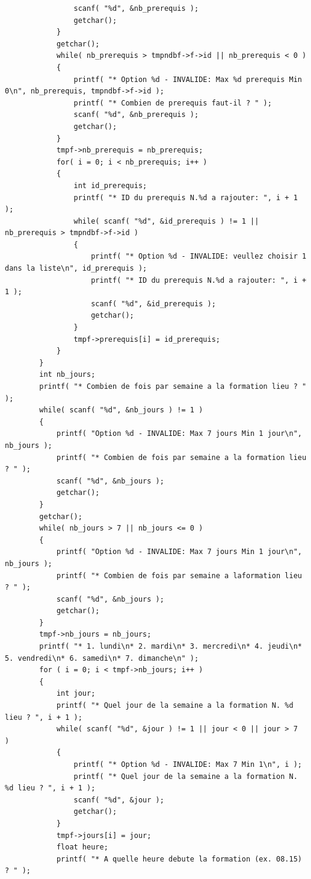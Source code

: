 \documentclass[11pt]{article}
\begin{document}
\begin{lstlisting}
                scanf( "%d", &nb_prerequis );
                getchar();
            }
            getchar();
            while( nb_prerequis > tmpndbf->f->id || nb_prerequis < 0 )
            {
                printf( "* Option %d - INVALIDE: Max %d prerequis Min 0\n", nb_prerequis, tmpndbf->f->id );
                printf( "* Combien de prerequis faut-il ? " );
                scanf( "%d", &nb_prerequis );
                getchar();
            }
            tmpf->nb_prerequis = nb_prerequis;
            for( i = 0; i < nb_prerequis; i++ )
            {
                int id_prerequis;
                printf( "* ID du prerequis N.%d a rajouter: ", i + 1 );
                while( scanf( "%d", &id_prerequis ) != 1 || nb_prerequis > tmpndbf->f->id )
                {
                    printf( "* Option %d - INVALIDE: veullez choisir 1 dans la liste\n", id_prerequis );
                    printf( "* ID du prerequis N.%d a rajouter: ", i + 1 );
                    scanf( "%d", &id_prerequis );
                    getchar();
                }
                tmpf->prerequis[i] = id_prerequis;
            }
        }
        int nb_jours;
        printf( "* Combien de fois par semaine a la formation lieu ? " );
        while( scanf( "%d", &nb_jours ) != 1 )
        {
            printf( "Option %d - INVALIDE: Max 7 jours Min 1 jour\n", nb_jours );
            printf( "* Combien de fois par semaine a la formation lieu ? " );
            scanf( "%d", &nb_jours );
            getchar();
        }
        getchar();
        while( nb_jours > 7 || nb_jours <= 0 )
        {
            printf( "Option %d - INVALIDE: Max 7 jours Min 1 jour\n", nb_jours );
            printf( "* Combien de fois par semaine a laformation lieu ? " );
            scanf( "%d", &nb_jours );
            getchar();
        }
        tmpf->nb_jours = nb_jours;
        printf( "* 1. lundi\n* 2. mardi\n* 3. mercredi\n* 4. jeudi\n* 5. vendredi\n* 6. samedi\n* 7. dimanche\n" );
        for ( i = 0; i < tmpf->nb_jours; i++ )
        {
            int jour;
            printf( "* Quel jour de la semaine a la formation N. %d lieu ? ", i + 1 );
            while( scanf( "%d", &jour ) != 1 || jour < 0 || jour > 7  )
            {
                printf( "* Option %d - INVALIDE: Max 7 Min 1\n", i );
                printf( "* Quel jour de la semaine a la formation N. %d lieu ? ", i + 1 );
                scanf( "%d", &jour );
                getchar();
            }
            tmpf->jours[i] = jour;
            float heure;
            printf( "* A quelle heure debute la formation (ex. 08.15) ? " );

\end{lstlisting}
\end{document}
